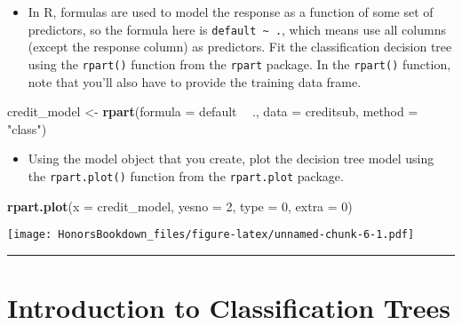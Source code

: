 \documentclass[
]{book}
\newenvironment{Shaded}{\begin{snugshade}}{\end{snugshade}}
\newcommand{\DataTypeTok}[1]{\textcolor[rgb]{0.13,0.29,0.53}{#1}}
\newcommand{\DecValTok}[1]{\textcolor[rgb]{0.00,0.00,0.81}{#1}}
\newcommand{\KeywordTok}[1]{\textcolor[rgb]{0.13,0.29,0.53}{\textbf{#1}}}
\newcommand{\NormalTok}[1]{#1}
\newcommand{\OperatorTok}[1]{\textcolor[rgb]{0.81,0.36,0.00}{\textbf{#1}}}
\newcommand{\StringTok}[1]{\textcolor[rgb]{0.31,0.60,0.02}{#1}}
\providecommand{\tightlist}{%
  \setlength{\itemsep}{0pt}\setlength{\parskip}{0pt}}
\begin{document}
\begin{itemize}
\tightlist
\item
  In R, formulas are used to model the response as a function of some set of predictors, so the formula here is \texttt{default\ \textasciitilde{}\ .}, which means use all columns (except the response column) as predictors. Fit the classification decision tree using the \texttt{rpart()} function from the \texttt{rpart} package. In the \texttt{rpart()} function, note that you'll also have to provide the training data frame.
\end{itemize}

\begin{Shaded}
\begin{Highlighting}[]
\NormalTok{credit_model <-}\StringTok{ }\KeywordTok{rpart}\NormalTok{(}\DataTypeTok{formula =}\NormalTok{ default }\OperatorTok{~}\StringTok{ }\NormalTok{., }
                      \DataTypeTok{data =}\NormalTok{ creditsub, }
                      \DataTypeTok{method =} \StringTok{"class"}\NormalTok{)}
\end{Highlighting}
\end{Shaded}

\begin{itemize}
\tightlist
\item
  Using the model object that you create, plot the decision tree model using the \texttt{rpart.plot()} function from the \texttt{rpart.plot} package.
\end{itemize}

\begin{Shaded}
\begin{Highlighting}[]
\KeywordTok{rpart.plot}\NormalTok{(}\DataTypeTok{x =}\NormalTok{ credit_model, }\DataTypeTok{yesno =} \DecValTok{2}\NormalTok{, }\DataTypeTok{type =} \DecValTok{0}\NormalTok{, }\DataTypeTok{extra =} \DecValTok{0}\NormalTok{)}
\end{Highlighting}
\end{Shaded}

\texttt{[image: HonorsBookdown\_files/figure-latex/unnamed-chunk-6-1.pdf]}

\begin{center}\rule{0.5\linewidth}{0.5pt}\end{center}

\hypertarget{introduction-to-classification-trees}{%
\section{Introduction to Classification Trees}\label{introduction-to-classification-trees}}
\end{document}
